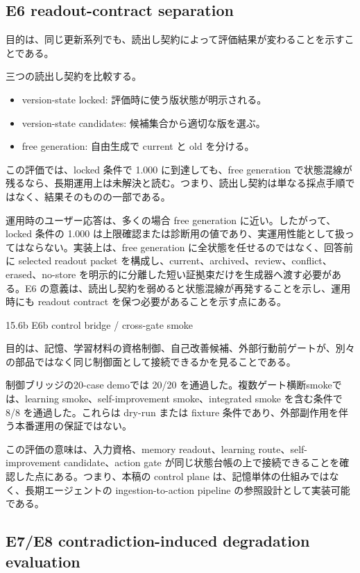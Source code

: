 \documentclass[12pt,a4paper]{article}
\begin{document}
\subsection{E6 readout-contract separation}\label{e6-readout-contract-separation}

目的は、同じ更新系列でも、読出し契約によって評価結果が変わることを示すことである。

三つの読出し契約を比較する。

\begin{itemize}
\tightlist
\item
  version-state locked: 評価時に使う版状態が明示される。
\item
  version-state candidates: 候補集合から適切な版を選ぶ。
\item
  free generation: 自由生成で current と old を分ける。
\end{itemize}

この評価では、locked 条件で 1.000 に到達しても、free generation で状態混線が残るなら、長期運用上は未解決と読む。つまり、読出し契約は単なる採点手順ではなく、結果そのものの一部である。

運用時のユーザー応答は、多くの場合 free generation に近い。したがって、locked 条件の 1.000 は上限確認または診断用の値であり、実運用性能として扱ってはならない。実装上は、free generation に全状態を任せるのではなく、回答前に selected readout packet を構成し、current、archived、review、conflict、erased、no-store を明示的に分離した短い証拠束だけを生成器へ渡す必要がある。E6 の意義は、読出し契約を弱めると状態混線が再発することを示し、運用時にも readout contract を保つ必要があることを示す点にある。

15.6b E6b control bridge / cross-gate smoke

目的は、記憶、学習材料の資格制御、自己改善候補、外部行動前ゲートが、別々の部品ではなく同じ制御面として接続できるかを見ることである。

制御ブリッジの20-case demoでは 20/20 を通過した。複数ゲート横断smokeでは、learning smoke、self-improvement smoke、integrated smoke を含む条件で 8/8 を通過した。これらは dry-run または fixture 条件であり、外部副作用を伴う本番運用の保証ではない。

この評価の意味は、入力資格、memory readout、learning route、self-improvement candidate、action gate が同じ状態台帳の上で接続できることを確認した点にある。つまり、本稿の control plane は、記憶単体の仕組みではなく、長期エージェントの ingestion-to-action pipeline の参照設計として実装可能である。

\subsection{E7/E8 contradiction-induced degradation evaluation}\label{e7e8-contradiction-induced-degradation-evaluation}
\end{document}
